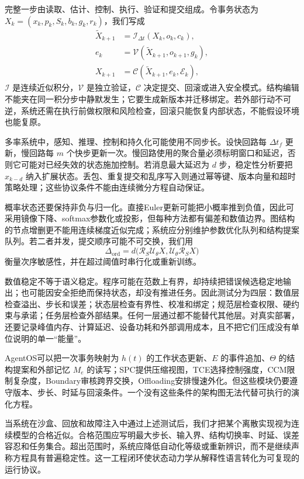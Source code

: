 完整一步由读取、估计、控制、执行、验证和提交组成。令事务状态为 $X_k=(x_k,p_k,S_k,b_k,g_k,r_k)$，我们写成
\begin{align}
 \tilde X_{k+1}&=\mathcal I_{\Delta t}(X_k,o_k,c_k),\\
 e_k&=\mathcal V(\tilde X_{k+1},o_{k+1},g_k),\\
 X_{k+1}&=\mathcal C(\tilde X_{k+1},e_k,\mathcal E_k),
\end{align}
$\mathcal I$ 是连续近似积分，$\mathcal V$ 是独立验证，$\mathcal C$ 决定提交、回滚或进入安全模式。结构编辑不能夹在同一积分步中静默发生；它要生成新版本并迁移绑定。若外部行动不可逆，系统还需在执行前做权限和风险检查，回滚只能恢复内部状态，不能假设环境也能复原。

多率系统中，感知、推理、控制和持久化可能使用不同步长。设快回路每 $\Delta t_f$ 更新，慢回路每 $m$ 个快步更新一次。慢回路使用的聚合量必须标明窗口和延迟，否则它可能对已经失效的状态施加控制。若消息最大延迟为 $d$ 步，稳定性分析要把 $x_{k-d}$ 纳入扩展状态。丢包、重复提交和乱序写入则通过幂等键、版本向量和超时策略处理；这些协议条件不能由连续微分方程自动保证。

概率状态还要保持非负与归一化。直接Euler更新可能把小概率推到负值，因此可采用镜像下降、softmax参数化或投影，但每种方法都有偏差和数值边界。图结构的节点增删更不能用连续梯度近似完成；系统应分别维护参数优化队列和结构提案队列。若二者并发，提交顺序可能不可交换，我们用
\begin{equation}
 \Delta_{\mathrm{ord}}=d\bigl(\mathcal R_S\mathcal U_\theta X,
 \mathcal U_\theta\mathcal R_S X\bigr)
\end{equation}
衡量次序敏感性，并在超过阈值时串行化或重新训练。

数值稳定不等于语义稳定。程序可能在范数上有界，却持续把错误候选稳定地输出；也可能因安全拒绝而保持状态，却没有推进任务。因此测试分为四层：数值层检查溢出、步长和误差；状态层检查有界性、校准和绑定；规范层检查权限、硬约束与承诺；任务层检查外部结果。任何一层通过都不能替代其他层。对真实部署，还要记录峰值内存、计算延迟、设备功耗和外部调用成本，且不把它们压成没有单位说明的单一“能量”。

AgentOS可以把一次事务映射为 $h(t)$ 的工作状态更新、$E$ 的事件追加、$\Theta$ 的结构提案和外部记忆 $M_e$ 的读写；SPC提供压缩视图，TCE选择控制强度，CCM限制复杂度，Boundary审核跨界交换，Offloading安排慢速外化。但这些模块仍要遵守版本、步长、时延与回滚条件。一个没有这些条件的架构图无法代替可执行的演化方程。

当系统在沙盒、回放和故障注入中通过上述测试后，我们才把某个离散实现视为连续模型的合格近似。合格范围应写明最大步长、输入界、结构切换率、时延、误差容忍和任务集合。超出范围时，系统应降低自动化等级或重新辨识，而不是继续声称方程具有普遍稳定性。这一工程闭环使状态动力学从解释性语言转化为可复现的运行协议。

